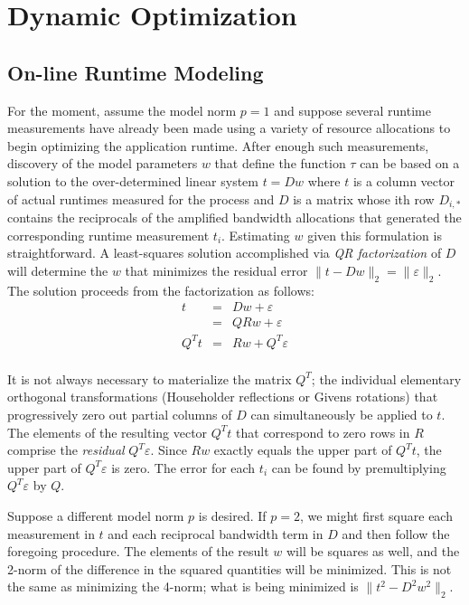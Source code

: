 \section{Dynamic Optimization}
\subsection*{On-line Runtime Modeling}

For the moment, assume the model norm $p = 1$ and suppose several runtime measurements have already been made using a variety of resource allocations to begin optimizing the application runtime.  After enough such measurements, discovery of the model parameters $w$ that define the function $\tau$ can be based on a solution to the over-determined linear system
$t=Dw$
where $t$ is a column vector of actual runtimes measured for the process
and $D$ is a matrix whose ith row $D_{i,*}$ contains the reciprocals of the amplified bandwidth allocations
that generated the corresponding runtime measurement $t_i$.
Estimating $w$ given this formulation is straightforward.  A least-squares solution accomplished via
\emph{QR factorization}\cite{GV} of $D$ will determine the $w$ that minimizes the residual error $\|t - Dw\|_2 = \|\varepsilon\|_2$.
The solution proceeds from the factorization as follows:
\begin{eqnarray*}
t    &=& Dw  + \varepsilon    \\
        &=& QRw + \varepsilon    \\
Q^Tt &=& Rw  + Q^T\varepsilon \\
\end{eqnarray*}

It is not always necessary to materialize the matrix $Q^T$; the individual elementary orthogonal transformations (Householder reflections or Givens rotations) that progressively zero out partial columns of $D$ can simultaneously be applied to $t$.  The elements of the resulting vector $Q^Tt$ that correspond to zero rows in $R$ comprise the \emph{residual} $Q^T\varepsilon$.
Since $Rw$ exactly equals the upper part of $Q^Tt$, the upper part of $Q^T\varepsilon$ is zero. The error for each $t_i$
can be found by premultiplying $Q^T\varepsilon$ by $Q$.

Suppose a different model norm $p$ is desired.  If $p = 2$, we might first square each measurement in $t$
and each reciprocal bandwidth term in $D$ and then follow the foregoing procedure.
The elements of the result $w$ will be squares as well, and the 2-norm of the difference in the squared quantities will be minimized.  This is not the same as minimizing the 4-norm; what is being minimized is $\|t^2 - D^2w^2\|_2$.

